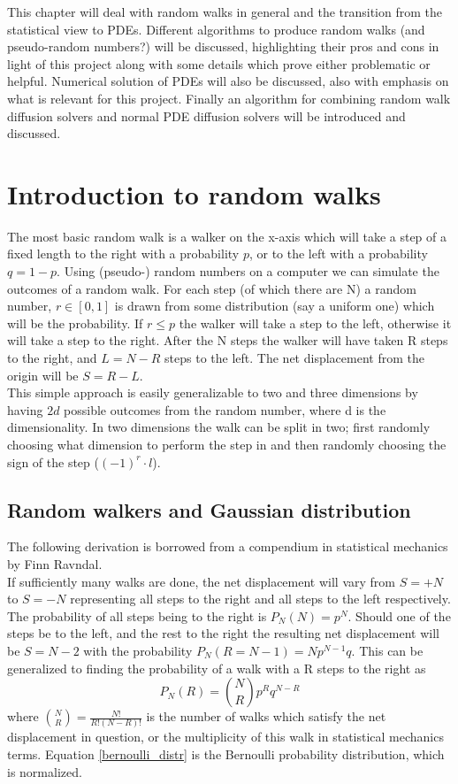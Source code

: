 
This chapter will deal with random walks in general and the transition from the statistical view to PDEs. 
Different algorithms to produce random walks (and pseudo-random numbers?) will be discussed, highlighting their pros and cons in light of this project along with some details which prove either problematic or helpful. 
Numerical solution of PDEs will also be discussed, also with emphasis on what is relevant for this project. 
Finally an algorithm for combining random walk diffusion solvers and normal PDE diffusion solvers will be introduced and discussed.


\section{Introduction to random walks}\label{introduction_to_random_walks}
The most basic random walk is a walker on the x-axis which will take a step of a fixed length to the right with a probability $p$, or to the left with a probability $q=1-p$. 
Using (pseudo-) random numbers on a computer we can simulate the outcomes of a random walk. 
For each step (of which there are N) a random number, $r\in [0,1]$ is drawn from some distribution (say a uniform one) which will be the probability. 
If $r\leq p$ the walker will take a step to the left, otherwise it will take a step to the right. 
After the N steps the walker will have taken R steps to the right, and $L = N-R$ steps to the left. 
The net displacement from the origin will be $S = R-L$. \\
This simple approach is easily generalizable to two and three dimensions by having $2d$ possible outcomes from the random number, where d is the dimensionality. 
In two dimensions the walk can be split in two; first randomly choosing what dimension to perform the step in and then randomly choosing the sign of the step ($(-1)^r\cdot l$).

\subsection{Random walkers and Gaussian distribution}\label{further_introduction}
The following derivation is borrowed from a compendium in statistical mechanics by Finn Ravndal. \\
If sufficiently many walks are done, the net displacement will vary from $S=+N$ to $S=-N$ representing all steps to the right and all steps to the left respectively. 
The probability of all steps being to the right is $P_N(N) = p^N$. 
Should one of the steps be to the left, and the rest to the right the resulting net displacement will be $S = N-2$ with the probability $P_N(R = N-1) = Np^{N-1}q$. 
This can be generalized to finding the probability of a walk with a R steps to the right as 
\begin{equation}\label{bernoulli_distr}
 P_N(R) = {N\choose R}p^{R}q^{N-R}
\end{equation}
where ${N\choose R}=\frac{N!}{R!(N-R)!}$ is the number of walks which satisfy the net displacement in question, or the multiplicity of this walk in statistical mechanics terms. 
Equation \ref{bernoulli_distr} is the Bernoulli probability distribution, which is normalized.

